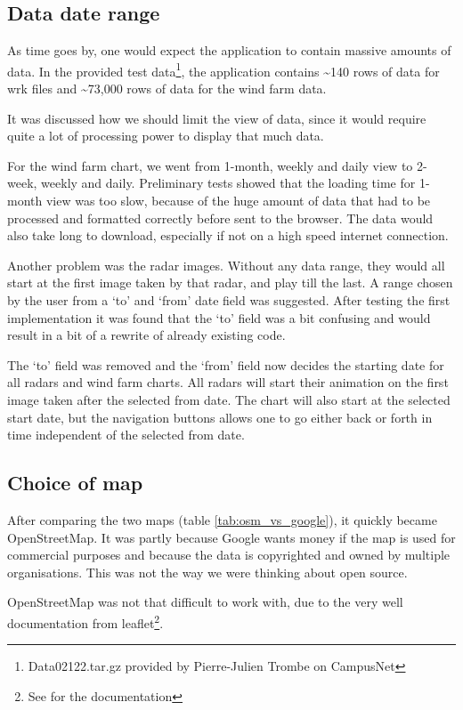 \subsection{Data date range}
As time goes by, one would expect the application to contain massive amounts of data.
In the provided test data\footnote{Data02122.tar.gz provided by Pierre-Julien Trombe on CampusNet}, the application contains \textasciitilde 140 rows of data for \textsf{wrk} files and \textasciitilde 73,000 rows of data for the wind farm data.

It was discussed how we should limit the view of data, since it would require quite a lot of processing power to display that much data.

For the wind farm chart, we went from 1-month, weekly and daily view to 2-week, weekly and daily.
Preliminary tests showed that the loading time for 1-month view was too slow, because of the huge amount of data that had to be processed and formatted correctly before sent to the browser. The data would also take long to download, especially if not on a high speed internet connection.

Another problem was the radar images. Without any data range, they would all start at the first image taken by that radar, and play till the last. A range chosen by the user from a `to' and `from' date field was suggested. After testing the first implementation it was found that the `to' field was a bit confusing and would result in a bit of a rewrite of already existing code.

The `to' field was removed and the `from' field now decides the starting date for all radars and wind farm charts.
All radars will start their animation on the first image taken after the selected from date.
The chart will also start at the selected start date, but the navigation buttons allows one to go either back or forth in time independent of the selected from date.

\subsection{Choice of map}
After comparing the two maps (table \ref{tab:osm_vs_google}), it quickly became OpenStreetMap. It was partly because Google wants money if the map is used for commercial purposes and because the data is copyrighted and owned by multiple organisations. This was not the way we were thinking about open source.

OpenStreetMap was not that difficult to work with, due to the very well documentation from leaflet\footnote{See \cite{leaflet} for the documentation}.

